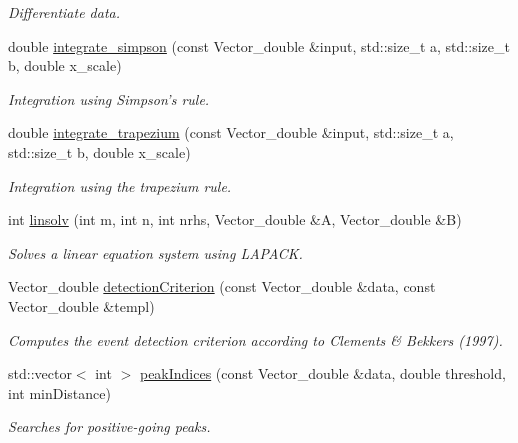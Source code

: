 \begin{DoxyCompactItemize}
\begin{DoxyCompactList}\small\item\em Differentiate data. \item\end{DoxyCompactList}\item 
double \hyperlink{group__stfgen_ga278bc04e06ac5796e0867b158ae4797b}{integrate\_\-simpson} (const Vector\_\-double \&input, std::size\_\-t a, std::size\_\-t b, double x\_\-scale)
\begin{DoxyCompactList}\small\item\em Integration using Simpson's rule. \item\end{DoxyCompactList}\item 
double \hyperlink{group__stfgen_ga0be2d046407da1c77424a79fa01924ab}{integrate\_\-trapezium} (const Vector\_\-double \&input, std::size\_\-t a, std::size\_\-t b, double x\_\-scale)
\begin{DoxyCompactList}\small\item\em Integration using the trapezium rule. \item\end{DoxyCompactList}\item 
int \hyperlink{group__stfgen_ga2e6063c1fcb15672fb84c44065e32455}{linsolv} (int m, int n, int nrhs, Vector\_\-double \&A, Vector\_\-double \&B)
\begin{DoxyCompactList}\small\item\em Solves a linear equation system using LAPACK. \item\end{DoxyCompactList}\item 
Vector\_\-double \hyperlink{group__stfgen_gaaaca81c58d327e730c0e785e578ec24e}{detectionCriterion} (const Vector\_\-double \&data, const Vector\_\-double \&templ)
\begin{DoxyCompactList}\small\item\em Computes the event detection criterion according to Clements \& Bekkers (1997). \item\end{DoxyCompactList}\item 
std::vector$<$ int $>$ \hyperlink{group__stfgen_ga211ecf55c013f280fd1a87d9b762f79e}{peakIndices} (const Vector\_\-double \&data, double threshold, int minDistance)
\begin{DoxyCompactList}\small\item\em Searches for positive-\/going peaks. \item\end{DoxyCompactList}\item 

\end{DoxyCompactItemize}
